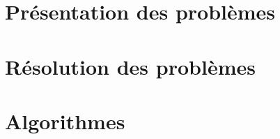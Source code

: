 \documentclass[a4paper,9pt]{report}
\newcommand{\incdir}{inc/}
\begin{document}
%

\chapter{Pr\'{e}sentation des problèmes}



\chapter{Résolution des problèmes}



\newpage
\appendix
\appendixpageoff

\chapter{Algorithmes}


\end{document}
